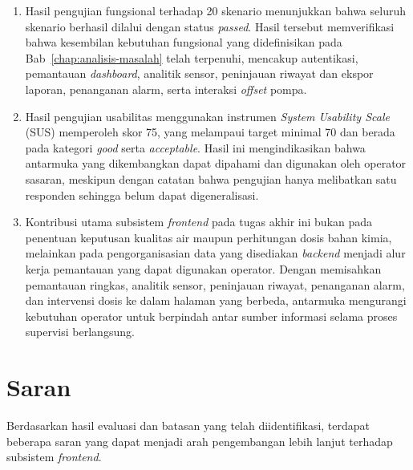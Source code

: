 \begin{enumerate}
    \item Hasil pengujian fungsional terhadap 20 skenario menunjukkan bahwa seluruh skenario berhasil dilalui 
    dengan status \textit{passed}. Hasil tersebut memverifikasi bahwa kesembilan kebutuhan fungsional yang 
    didefinisikan pada Bab~\ref{chap:analisis-masalah} telah terpenuhi, mencakup autentikasi, pemantauan 
    \textit{dashboard}, analitik sensor, peninjauan riwayat dan ekspor laporan, penanganan alarm, serta interaksi 
    \textit{offset} pompa.

    \item Hasil pengujian usabilitas menggunakan instrumen \textit{System Usability Scale} (SUS) memperoleh skor 
    75, yang melampaui target minimal 70 dan berada pada kategori \textit{good} serta \textit{acceptable}. Hasil 
    ini mengindikasikan bahwa antarmuka yang dikembangkan dapat dipahami dan digunakan oleh operator sasaran, 
    meskipun dengan catatan bahwa pengujian hanya melibatkan satu responden sehingga belum dapat digeneralisasi.

    \item Kontribusi utama subsistem \textit{frontend} pada tugas akhir ini bukan pada penentuan keputusan 
    kualitas air maupun perhitungan dosis bahan kimia, melainkan pada pengorganisasian data yang disediakan 
    \textit{backend} menjadi alur kerja pemantauan yang dapat digunakan operator. Dengan memisahkan pemantauan 
    ringkas, analitik sensor, peninjauan riwayat, penanganan alarm, dan intervensi dosis ke dalam halaman yang 
    berbeda, antarmuka mengurangi kebutuhan operator untuk berpindah antar sumber informasi selama proses 
    supervisi berlangsung.
\end{enumerate}

\section{Saran}
Berdasarkan hasil evaluasi dan batasan yang telah diidentifikasi, terdapat beberapa saran yang dapat menjadi 
arah pengembangan lebih lanjut terhadap subsistem \textit{frontend}.

